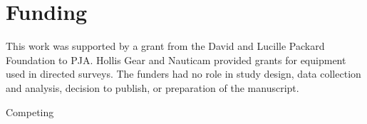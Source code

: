 \section{Funding}
\label{funding} 
This work was supported by a grant from the David and Lucille Packard Foundation to PJA. Hollis Gear and Nauticam provided grants for equipment used in directed surveys. The funders had no role in study design, data collection and analysis, 
decision to publish, or preparation of the manuscript.

Competing 

